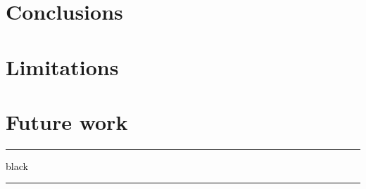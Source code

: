 \documentclass[english, bibtex]{kththesis}
\begin{document}
\section{Conclusions}
\section{Limitations}
\section{Future work}


\noindent\rule{\textwidth}{0.4mm}

\cleardoublepage
\renewcommand{\bibname}{References}

\ifbiblatex
    \printbibliography[heading=bibintoc]
\else
    
\fi




\cleardoublepage
\appendix
\renewcommand{\chaptermark}[1]{\markboth{Appendix \thechapter\relax:\thinspace\relax#1}{}}


\textcolor{black}{black} {\color{black} \rule{\linewidth}{1mm} }

\label{pg:lastPageofMainmatter}

\clearpage
\fancyhead{}  %
\end{document}
